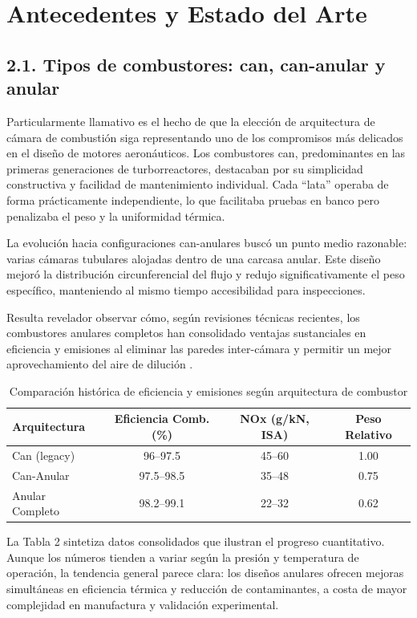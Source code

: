 \section{Antecedentes y Estado del Arte}

\subsection{2.1. Tipos de combustores: can, can-anular y anular}

Particularmente llamativo es el hecho de que la elección de arquitectura de cámara de combustión siga representando uno de los compromisos más delicados en el diseño de motores aeronáuticos. Los combustores can, predominantes en las primeras generaciones de turborreactores, destacaban por su simplicidad constructiva y facilidad de mantenimiento individual. Cada “lata” operaba de forma prácticamente independiente, lo que facilitaba pruebas en banco pero penalizaba el peso y la uniformidad térmica.

La evolución hacia configuraciones can-anulares buscó un punto medio razonable: varias cámaras tubulares alojadas dentro de una carcasa anular. Este diseño mejoró la distribución circunferencial del flujo y redujo significativamente el peso específico, manteniendo al mismo tiempo accesibilidad para inspecciones. 

Resulta revelador observar cómo, según revisiones técnicas recientes, los combustores anulares completos han consolidado ventajas sustanciales en eficiencia y emisiones al eliminar las paredes inter-cámara y permitir un mejor aprovechamiento del aire de dilución \cite{SafeFly2025}. 

\begin{table}[h]
\centering
\caption{Comparación histórica de eficiencia y emisiones según arquitectura de combustor}
\label{tab:comparacion_historica}
\begin{tabular}{lccc}
\hline
Arquitectura & Eficiencia Comb. (\%) & NOx (g/kN, ISA) & Peso Relativo \\
\hline
Can (legacy) & 96--97.5 & 45--60 & 1.00 \\
Can-Anular & 97.5--98.5 & 35--48 & 0.75 \\
Anular Completo & 98.2--99.1 & 22--32 & 0.62 \\
\hline
\end{tabular}
\end{table}

La Tabla 2 sintetiza datos consolidados que ilustran el progreso cuantitativo. Aunque los números tienden a variar según la presión y temperatura de operación, la tendencia general parece clara: los diseños anulares ofrecen mejoras simultáneas en eficiencia térmica y reducción de contaminantes, a costa de mayor complejidad en manufactura y validación experimental.

